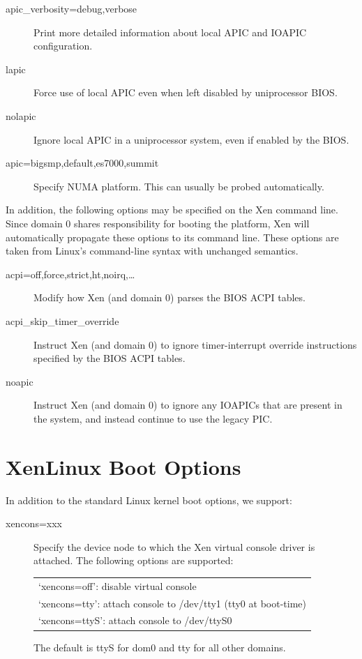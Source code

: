 \documentclass[11pt,twoside,final,openright]{report}
\begin{document}
{\begin{description}
\item [apic\_verbosity=debug,verbose ]
 Print more detailed information about local APIC and IOAPIC configuration.

\item [lapic ]
 Force use of local APIC even when left disabled by uniprocessor BIOS.

\item [nolapic ]
 Ignore local APIC in a uniprocessor system, even if enabled by the BIOS.

\item [apic=bigsmp,default,es7000,summit ]
 Specify NUMA platform. This can usually be probed automatically.

\end{description} 

In addition, the following options may be specified on the Xen command
line. Since domain 0 shares responsibility for booting the platform,
Xen will automatically propagate these options to its command
line. These options are taken from Linux's command-line syntax with
unchanged semantics.

\begin{description}
\item [acpi=off,force,strict,ht,noirq,\ldots ] 
 Modify how Xen (and domain 0) parses the BIOS ACPI tables.

\item [acpi\_skip\_timer\_override ]
 Instruct Xen (and domain 0) to ignore timer-interrupt override
 instructions specified by the BIOS ACPI tables.

\item [noapic ]
 Instruct Xen (and domain 0) to ignore any IOAPICs that are present in
 the system, and instead continue to use the legacy PIC.

\end{description} 

\section{XenLinux Boot Options}

In addition to the standard Linux kernel boot options, we support: 
\begin{description} 
\item[xencons=xxx ] Specify the device node to which the Xen virtual
console driver is attached. The following options are supported:
\begin{center}
\begin{tabular}{l}
`xencons=off': disable virtual console \\ 
`xencons=tty': attach console to /dev/tty1 (tty0 at boot-time) \\
`xencons=ttyS': attach console to /dev/ttyS0
\end{tabular}
\end{center}
The default is ttyS for dom0 and tty for all other domains.
\end{description} 



}
\end{document}
